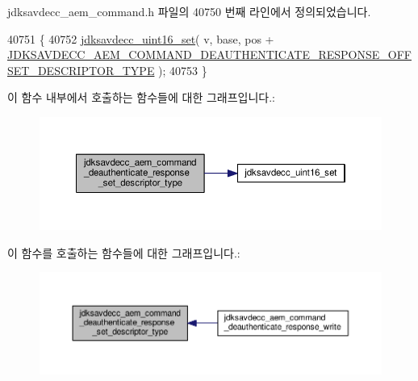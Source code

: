 jdksavdecc\+\_\+aem\+\_\+command.\+h 파일의 40750 번째 라인에서 정의되었습니다.


\begin{DoxyCode}
40751 \{
40752     \hyperlink{group__endian_ga14b9eeadc05f94334096c127c955a60b}{jdksavdecc\_uint16\_set}( v, base, pos + 
      \hyperlink{group__command__deauthenticate__response_ga216a1d0cd05e807384d5dcd4a6664e0d}{JDKSAVDECC\_AEM\_COMMAND\_DEAUTHENTICATE\_RESPONSE\_OFFSET\_DESCRIPTOR\_TYPE}
       );
40753 \}
\end{DoxyCode}


이 함수 내부에서 호출하는 함수들에 대한 그래프입니다.\+:
\nopagebreak
\begin{figure}[H]
\begin{center}
\leavevmode
\includegraphics[width=350pt]{group__command__deauthenticate__response_ga8e48c2943a39a9e86574938a601d5d7e_cgraph}
\end{center}
\end{figure}




이 함수를 호출하는 함수들에 대한 그래프입니다.\+:
\nopagebreak
\begin{figure}[H]
\begin{center}
\leavevmode
\includegraphics[width=350pt]{group__command__deauthenticate__response_ga8e48c2943a39a9e86574938a601d5d7e_icgraph}
\end{center}
\end{figure}


